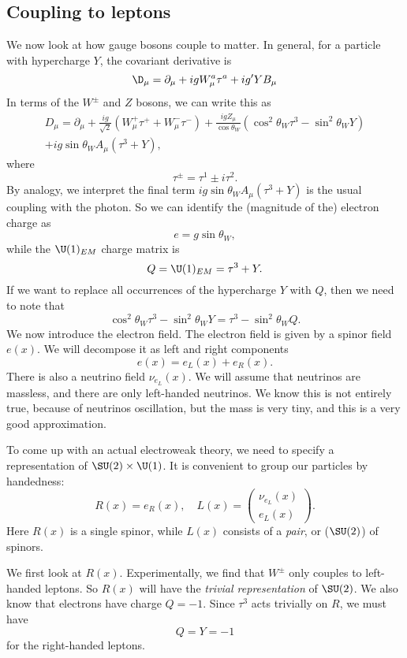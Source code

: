\documentclass[a4paper]{article}
\begin{document}
\subsection{Coupling to leptons}
We now look at how gauge bosons couple to matter. In general, for a particle with hypercharge $Y$, the covariant derivative is
\[
  \D_\mu = \partial_\mu + i g W_\mu^a \tau^a + i g' Y B_\mu
\]
In terms of the $W^{\pm}$ and $Z$ bosons, we can write this as
\begin{multline*}
  D_\mu = \partial_\mu + \frac{ig}{\sqrt{2}} (W_\mu^+ \tau^+ + W_\mu^- \tau^-) + \frac{ig Z_\mu}{\cos \theta_W} (\cos^2 \theta_W \tau^3 - \sin^2 \theta_W Y) \\
  + ig \sin \theta_W A_\mu (\tau^3 + Y),
\end{multline*}
where
\[
  \tau^{\pm} = \tau^1 \pm i \tau^2.
\]
By analogy, we interpret the final term $ig \sin \theta_W A_\mu (\tau^3 + Y)$ is the usual coupling with the photon. So we can identify the (magnitude of the) electron charge as
\[
  e = g \sin \theta_W,
\]
while the $\U(1)_{EM}$ charge matrix is
\[
  Q = \U(1)_{EM} = \tau^3 + Y.
\]
If we want to replace all occurrences of the hypercharge $Y$ with $Q$, then we need to note that
\[
  \cos^2 \theta_W \tau^3 - \sin^2 \theta_W Y = \tau^3 - \sin^2 \theta_W Q.
\]
We now introduce the electron field. The electron field is given by a spinor field $e(x)$. We will decompose it as left and right components
\[
  e(x) = e_L(x) + e_R(x).
\]
There is also a neutrino field $\nu_{e_L}(x)$. We will assume that neutrinos are massless, and there are only left-handed neutrinos. We know this is not entirely true, because of neutrinos oscillation, but the mass is very tiny, and this is a very good approximation.

To come up with an actual electroweak theory, we need to specify a representation of $\SU(2) \times \U(1)$. It is convenient to group our particles by handedness:
\[
  R(x) = e_R(x),\quad L(x) =
  \begin{pmatrix}
    \nu_{e_L}(x)\\
    e_L(x)
  \end{pmatrix}.
\]
Here $R(x)$ is a single spinor, while $L(x)$ consists of a \emph{pair}, or ($\SU(2)$)  of spinors.

We first look at $R(x)$. Experimentally, we find that $W^{\pm}$ only couples to left-handed leptons. So $R(x)$ will have the \emph{trivial representation} of $\SU(2)$. We also know that electrons have charge $Q = -1$. Since $\tau^3$ acts trivially on $R$, we must have
\[
  Q = Y = -1
\]
for the right-handed leptons.
\end{document}
